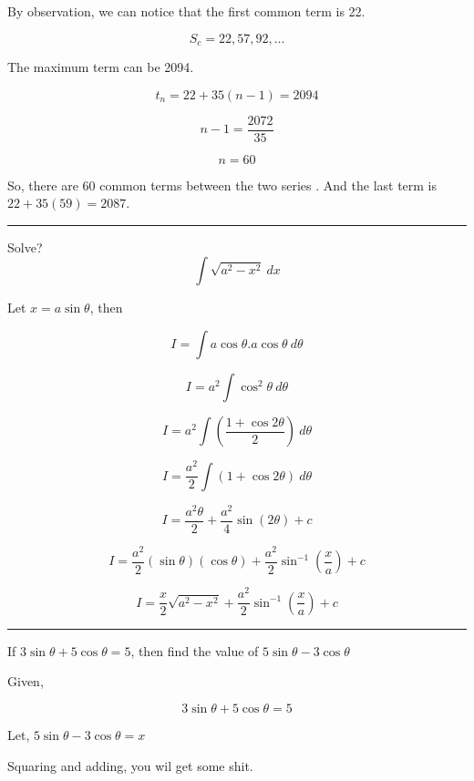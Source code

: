 \documentclass[twocolumn]{article}
\begin{document}
\vspace*{0.1in}

By observation, we can notice that the first common term is 22. 

\[
    S_c = 22 , 57, 92, \dots 
\]

The maximum term can be 2094.

\[
    t_{n} = 22 + 35(n-1) = 2094
\]

\[
    n-1 = \frac{2072}{35}
\]

\[
    n = 60
\]

So, there are 60 common terms between the two series . And the last term is \(22 + 35 (59) = \boxed{2087}\).

\vspace*{0.1in}

\hrule

\begin{question}
    Solve?
    \[
        \int \sqrt{a^{2} - x^{2} }\ dx
    \]
\end{question}

Let \(x = a\sin \theta \), then 

\[
    I = \int a \cos \theta. a\cos \theta \ d \theta 
\]

\[
    I = a^{2} \int \cos ^{2}  \theta \ d \theta 
\]

\[
    I = a^{2} \int  (\frac{ 1 + \cos 2\theta }{2})\ d \theta 
\]

\[
    I = \frac{a^{2}}{2} \int (1 + \cos 2 \theta )\ d \theta 
\]

\[
    I = \frac{a^{2} \theta }{2} + \frac{a^{2}}{4}\sin (2 \theta ) + c
\]

\[
    I = \frac{a^{2}}{2}(\sin \theta)(\cos \theta ) + \frac{a^{2}}{2}\sin^{-1} (\frac{x}{a}) + c 
\]

\[
    \boxed{I = \frac{x}{2}\sqrt{a^{2} -x^{2}} + \frac{a^{2}}{2} \sin^{-1} (\frac{x}{a}) + c}
\]

\hrule 

\begin{question}
    If \(3 \sin \theta + 5 \cos  \theta = 5\), then find the value of \(5\sin \theta  - 3\cos \theta\)  
\end{question}

Given, 

\[
    3\sin \theta + 5\cos \theta = 5
\]

Let, \(5\sin \theta  - 3\cos \theta  = x\)

\vspace*{0.1in}
Squaring and adding, you wil get some shit.
\vspace*{0.1in}
\end{document}
